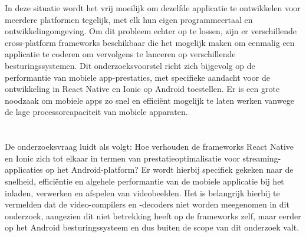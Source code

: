 In deze situatie wordt het vrij moeilijk om dezelfde applicatie te ontwikkelen voor meerdere platformen tegelijk, met elk hun eigen programmeertaal en ontwikkelingomgeving. Om dit probleem echter op te lossen, zijn er verschillende cross-platform frameworks beschikbaar die het mogelijk maken om eenmalig een applicatie te coderen om vervolgens te lanceren op verschillende besturingssystemen. Dit onderzoeksvoorstel richt zich bijgevolg op de performantie van mobiele app-prestaties, met specifieke aandacht voor de ontwikkeling in React Native en Ionic op Android toestellen. Er is een grote noodzaak om mobiele apps zo snel en efficiënt mogelijk te laten werken vanwege de lage processorcapaciteit van mobiele apparaten.

\section{}%
\label{sec:onderzoeksvraag}


De onderzoeksvraag luidt als volgt: Hoe verhouden de frameworks React Native en Ionic zich tot elkaar in termen van prestatieoptimalisatie voor streaming-applicaties op het Android-platform? Er wordt hierbij specifiek gekeken naar de snelheid, efficiëntie en algehele performantie van de mobiele applicatie bij het inladen, verwerken en afspelen van videobeelden. Het is belangrijk hierbij te vermelden dat de video-compilers en -decoders niet worden meegenomen in dit onderzoek, aangezien dit niet betrekking heeft op de frameworks zelf, maar eerder op het Android besturingssysteem en dus buiten de scope van dit onderzoek valt.

\section{}%
\label{sec:onderzoeksdoelstelling}


